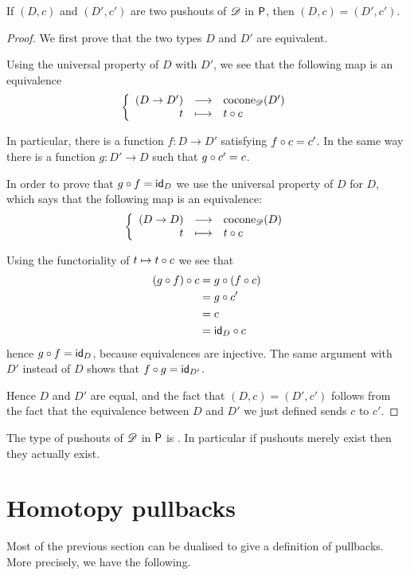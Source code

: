 \begin{lem}
  If $(D,c)$ and $(D',c')$ are two pushouts of $\Ddiag$ in $\P$, then
  $(D,c)=(D',c')$.
\end{lem}
\begin{proof}
  We first prove that the two types $D$ and $D'$ are equivalent.

  Using the universal property of $D$ with $D'$, we see that the following map is an
  equivalence
  \[\function{(D\to{}D')}{\cocone{\Ddiag}{D'}}{t}{\composecocone{t}c}\]

  In particular, there is a function $f:D\to{}D'$ satisfying $\composecocone{f}c=c'$. In the
  same way there is a function $g:D'\to{}D$ such that $\composecocone{g}c'=c$.

  In order to prove that $g\circ{}f=\idfunc[D]$ we use the universal property of
  $D$ for $D$, which says that the following map is an equivalence:
  \[\function{(D\to{}D)}{\cocone{\Ddiag}{D}}{t}{\composecocone{t}c}\]

  Using the functoriality of $t\mapsto{}\composecocone{t}c$ we see that
  \begin{align*}
    \composecocone{(g\circ{}f)}c &= \composecocone{g}(\composecocone{f}c) \\
    &= \composecocone{g}c' \\
    &= c \\
    &= \composecocone{\idfunc[D]}c
  \end{align*}
  hence
  $g\circ{}f=\idfunc[D]$, because equivalences are injective. The same argument
  with $D'$ instead of $D$ shows that $f\circ{}g=\idfunc[D']$.

  Hence $D$ and $D'$ are equal, and the fact that $(D,c)=(D',c')$ follows from
  the fact that the equivalence between $D$ and $D'$ we just defined sends $c$
  to $c'$.
\end{proof}

\begin{cor}
  The type of pushouts of $\Ddiag$ in $\P$ is \anhprop. In particular if
  pushouts merely exist then they actually exist.
\end{cor}


\section{Homotopy pullbacks}
\label{sec:pullbacks}

Most of the previous section can be dualised to give a definition of
pullbacks. More precisely, we have the following.


